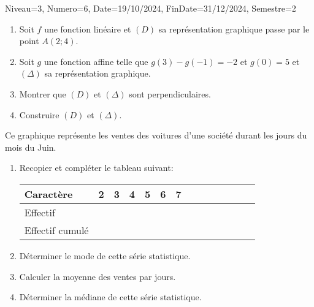 \documentclass[a4paper,12pt]{article}
\begin{document}
\begin{Maquette}[DM]{Niveau=3, Numero=6, Date=19/10/2024, FinDate=31/12/2024, Semestre=2}

\begin{exercice}
\begin{enumerate}
\item Soit $f$ une fonction linéaire et $(D)$ sa représentation graphique passe par le point $A(2;4)$.
\item Soit $g$ une fonction affine telle que $g(3)-g(-1)=-2$ et $g(0)=5$ et $(\Delta)$ sa représentation graphique.

\item Montrer que $(D)$ et $(\Delta)$ sont perpendiculaires.
\item Construire  $(D)$ et $(\Delta)$.
\end{enumerate}
\end{exercice}

\begin{exercice}
\begin{minipage}{.6\linewidth}
Ce graphique représente les ventes des voitures d'une société durant les jours du mois du Juin.
\begin{enumerate}
\item Recopier et compléter le tableau suivant:

\begin{tabular}{|*7{Oc|}}
\hline 
Caractère & 2 & 3 & 4 & 5 & 6 & 7 \\ 
\hline 
Effectif &  &  &  &  &  &  \\ 
\hline 
Effectif cumulé  &  &  &  &  &  &  \\ 
\hline 
\end{tabular}

\item Déterminer le mode de cette série statistique.
\item Calculer la moyenne des ventes par jours.
\item Déterminer la médiane de cette série statistique. 
\end{enumerate}
\end{minipage}%
\begin{minipage}{.4\linewidth}
\end{minipage}
\end{exercice}


\end{Maquette}
\end{document}
